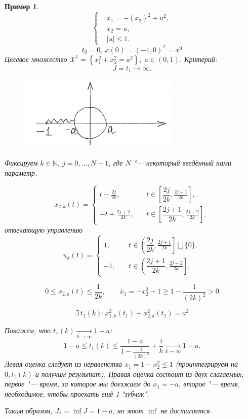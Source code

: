 \documentclass[12pt, a4paper]{article}
\theoremstyle{rusdef}
\newtheorem{example}{Пример}
\newcommand{\N}{\ensuremath{\mathbb{N}}} %
\newcommand{\X}{\mathscr{X}} %
\DeclareMathOperator*{\To}{\longrightarrow}
\begin{document}
\begin{example}
  \[
    \left\{
      \begin{aligned}
        &\dot{x}_1 = -(x_2)^2 + u^2, \\
        &\dot{x}_2 = u, \\
        &|u| \leqslant 1.
      \end{aligned}
    \right.
  \]
  \[
    t_0 = 0, \: x(0) = (-1, 0)^T = x^0
  \]
  Целевое множество $\X^1 = \left\{ x_1^2 + x_2^2 = a^2 \right\}, \; a \in (0, 1)$. Критерий:
  \[
    J = t_1 \to \infty.
  \]

  \begin{figure}[ht!]
    \centering
    \includegraphics{pic3.png}
  \end{figure}

  Фиксируем $k \in \N, \: j = 0, \ldots, N-1$, где $N$ "--- некоторый введённый нами параметр.

  \[
    x_{2,k}(t) = 
    \left\{
      \begin{aligned}
        t - \frac{2j}{2k}, &\quad t \in \left[\dfrac{2j}{2k}, \frac{2j + 1}{2k}\right], \\
        -t + \frac{2j + 2}{2k}, &\quad t \in \left[\dfrac{2j + 1}{2k}, \frac{2j + 2}{2k}\right],
      \end{aligned}
    \right.
  \]
  отвечающую управлению
  \[
    u_k(t) = 
    \left\{
      \begin{aligned}
        1, &\quad t \in \left(\dfrac{2j}{2k}, \frac{2j + 1}{2k}\right] \bigcup \{ 0 \}, \\
        -1, &\quad t \in \left(\dfrac{2j + 1}{2k}, \frac{2j + 2}{2k}\right],
      \end{aligned}
    \right.
  \]
  
  \[ 0 \leqslant x_{2, k}(t) \leqslant \dfrac{1}{2k}, \qquad \dot{x}_1 = - x_2^2 + 1 \geqslant 1 - \dfrac{1}{(2k)^2} > 0 \]

  \[ \exists\, t_1(k) \colon x_{1,k}^2(t_1) + x_{2,k}^2(t_1) = a^2 \]

  Покажем, что $t_1(k) \To\limits_{k \to \infty} 1 - a$:
  \[
    1 - a \leqslant t_1(k) \leqslant \dfrac{1 - a}{1 - \frac{1}{(2k)^2}} + \dfrac{1}{k} \To\limits_{k \to \infty} 1 - a.
  \]
  Левая оценка следует из неравенства $\dot{x}_1 = 1 - x_2^2 \leqslant 1$ (проинтегрируем на $0, t_1(k)$ и получим результат).
  Правая оценка состоит из двух слагаемых; первое "--- время, за которое мы доезжаем до $x_1 = -a$, второе "--- время, необходимое, чтобы проехать ещё 1 "зубчик".

  Таким образом, $J_* = \inf J = 1 - a$, но этот $\inf$ не достигается.
\end{example}
\end{document}
